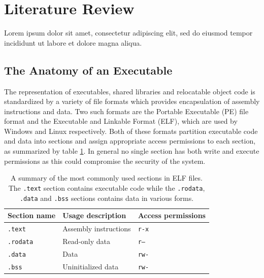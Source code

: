 \documentclass[12pt, a4paper]{article}
\begin{document}
\section{Literature Review}

Lorem ipsum dolor sit amet, consectetur adipiscing elit, sed do eiusmod tempor incididunt ut labore et dolore magna aliqua.


\subsection{The Anatomy of an Executable}
\label{executable_anatomy}

The representation of executables, shared libraries and relocatable object code is standardized by a variety of file formats which provides encapsulation of assembly instructions and data. Two such formats are the Portable Executable (PE) file format and the Executable and Linkable Format (ELF), which are used by Windows and Linux respectively. Both of these formats partition executable code and data into sections and assign appropriate access permissions to each section, as summarized by table \ref{elf_sections}. In general no single section has both write and execute permissions as this could compromise the security of the system.

\begin{table}[htbp]
	\begin{center}
		\begin{tabular}{|l|l|l|}
			\hline
			Section name & Usage description & Access permissions \\
			\hline
			\texttt{.text} & Assembly instructions & \texttt{r-x} \\
			\texttt{.rodata} & Read-only data & \texttt{r--} \\
			\texttt{.data} & Data & \texttt{rw-} \\
			\texttt{.bss} & Uninitialized data & \texttt{rw-} \\
			\hline
		\end{tabular}
	\end{center}
	\caption{A summary of the most commonly used sections in ELF files. The \texttt{.text} section contains executable code while the \texttt{.rodata}, \texttt{.data} and \texttt{.bss} sections contains data in various forms.}
	\label{elf_sections}
\end{table}
\end{document}
